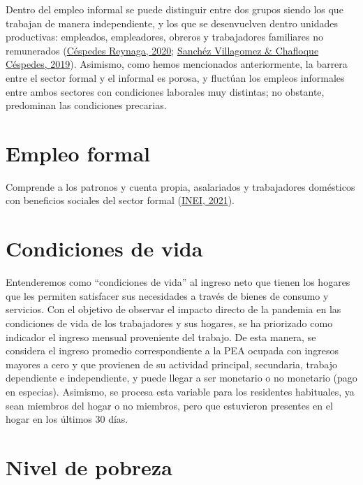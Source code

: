 \documentclass[
  letterpaper,
  12pt,
  oneside,
  spanish,
  doublespacing,
  headsepline,
  parskip]{MastersDoctoralThesis}
\begin{document}
Dentro del empleo informal se puede distinguir entre dos grupos siendo
los que trabajan de manera independiente, y los que se desenvuelven
dentro unidades productivas: empleados, empleadores, obreros y
trabajadores familiares no remunerados
(\protect\hyperlink{ref-cuxe9spedesreynaga2020}{Céspedes Reynaga, 2020};
\protect\hyperlink{ref-sanchuxe9zvillagomez2019}{Sanchéz Villagomez \&
Chafloque Céspedes, 2019}). Asimismo, como hemos mencionados
anteriormente, la barrera entre el sector formal y el informal es
porosa, y fluctúan los empleos informales entre ambos sectores con
condiciones laborales muy distintas; no obstante, predominan las
condiciones precarias.

\hypertarget{empleo-formal}{%
\section{Empleo formal}\label{empleo-formal}}

Comprende a los patronos y cuenta propia, asalariados y trabajadores
domésticos con beneficios sociales del sector formal
(\protect\hyperlink{ref-inei2021}{INEI, 2021}).

\hypertarget{condiciones-de-vida}{%
\section{Condiciones de vida}\label{condiciones-de-vida}}

Entenderemos como ``condiciones de vida'' al ingreso neto que tienen los
hogares que les permiten satisfacer sus necesidades a través de bienes
de consumo y servicios. Con el objetivo de observar el impacto directo
de la pandemia en las condiciones de vida de los trabajadores y sus
hogares, se ha priorizado como indicador el ingreso mensual proveniente
del trabajo. De esta manera, se considera el ingreso promedio
correspondiente a la PEA ocupada con ingresos mayores a cero y que
provienen de su actividad principal, secundaria, trabajo dependiente e
independiente, y puede llegar a ser monetario o no monetario (pago en
especias). Asimismo, se procesa esta variable para los residentes
habituales, ya sean miembros del hogar o no miembros, pero que
estuvieron presentes en el hogar en los últimos 30 días.

\hypertarget{nivel-de-pobreza}{%
\section{Nivel de pobreza}\label{nivel-de-pobreza}}
\end{document}
